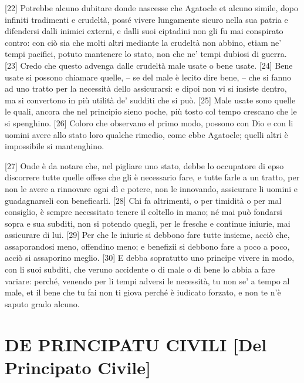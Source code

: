 {[}22{]} Potrebbe alcuno dubitare donde nascesse che Agatocle et alcuno
simile, dopo infiniti tradimenti e crudeltà, possé vivere lungamente
sicuro nella sua patria e difendersi dalli inimici externi, e dalli suoi
ciptadini non gli fu mai conspirato contro: con ciò sia che molti altri
mediante la crudeltà non abbino, etiam ne' tempi pacifici, potuto
mantenere lo stato, non che ne' tempi dubiosi di guerra. {[}23{]} Credo
che questo advenga dalle crudeltà male usate o bene usate. {[}24{]} Bene
usate si possono chiamare quelle, -- se del male è lecito dire bene, --
che si fanno ad uno tratto per la necessità dello assicurarsi: e dipoi
non vi si insiste dentro, ma si convertono in più utilità de' sudditi
che si può. {[}25{]} Male usate sono quelle le quali, ancora che nel
principio sieno poche, più tosto col tempo crescano che le si spenghino.
{[}26{]} Coloro che observano el primo modo, possono con Dio e con li
uomini avere allo stato loro qualche rimedio, come ebbe Agatocle; quelli
altri è impossibile si mantenghino.

{[}27{]} Onde è da notare che, nel pigliare uno stato, debbe lo
occupatore di epso discorrere tutte quelle offese che gli è necessario
fare, e tutte farle a un tratto, per non le avere a rinnovare ogni dì e
potere, non le innovando, assicurare li uomini e guadagnarseli con
beneficarli. {[}28{]} Chi fa altrimenti, o per timidità o per mal
consiglio, è sempre necessitato tenere il coltello in mano; né mai può
fondarsi sopra e sua subditi, non si potendo quegli, per le fresche e
continue iniurie, mai assicurare di lui. {[}29{]} Per che le iniurie si
debbono fare tutte insieme, acciò che, assaporandosi meno, offendino
meno; e benefizii si debbono fare a poco a poco, acciò si assaporino
meglio. {[}30{]} E debba sopratutto uno principe vivere in modo, con li
suoi subditi, che veruno accidente o di male o di bene lo abbia a fare
variare: perché, venendo per li tempi adversi le necessità, tu non se' a
tempo al male, et il bene che tu fai non ti giova perché è iudicato
forzato, e non te n'è saputo grado alcuno.

\quebra\section{DE PRINCIPATU CIVILI
{[}Del Principato Civile{]}}

